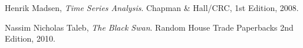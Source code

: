 \begin{thebibliography}{9}

  Henrik Madsen,
  \emph{Time Series Analysis}.
  Chapman \& Hall/CRC,
  1st Edition,
  2008.

  Nassim Nicholas Taleb,
  \emph{The Black Swan}.
  Random House Trade Paperbacks
  2nd Edition,
  2010.

\end{thebibliography}
